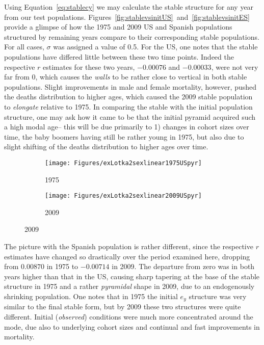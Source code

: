  \FloatBarrier
\label{sec:ex2sexdomweightsstabstruct}
Using Equation~\eqref{eq:stablecy} we may calculate the
stable structure for any year from our test populations.
Figures~\ref{fig:stablevsinitUS}~and~\ref{fig:stablevsinitES} provide a glimpse
of how the 1975 and 2009 US and Spanish populations structured by remaining
years compare to their corresponding stable populations. For all cases,
$\sigma$ was assigned a value of 0.5. For the US, one notes that the stable
populations have differed little between these two time points. Indeed the
respective $r$ estimates for these two years, $-0.00076$ and $-0.00033$, were 
not very far from 0, which causes the \textit{walls} to be rather close to vertical in both
stable populations. Slight improvements in male and female mortality, however,
pushed the deaths distribution to higher ages, which caused the 2009 stable
population to \textit{elongate} relative to 1975. In comparing the stable with the initial
population structure, one may ask how it came to be that the initial pyramid
acquired such a high modal age-- this will be due primarily to 1) changes in
cohort sizes over time, the baby boomers having still be rather young in 1975,
but also due to slight shifting of the deaths distribution to higher ages over
time.
 
\begin{figure}[!ht]
   \caption{US, stable ($\sigma = 0.05$) versus initial $e_y$-structures, 1975
   and 2009}
   \label{fig:stablevsinitUS}
        \centering
        \begin{subfigure}
                \centering
                \caption*{1975}
                \texttt{[image: Figures/exLotka2sexlinear1975USpyr]}
        \end{subfigure}
        \begin{subfigure}
                \centering
                \caption*{2009}
                \texttt{[image: Figures/exLotka2sexlinear2009USpyr]}
        \end{subfigure}
\end{figure}
 
The picture with the Spanish population is rather different, since the
respective $r$ estimates have changed so drastically over the period examined
here, dropping from $0.00870$ in 1975 to $-0.00714$ in 2009. The departure from
zero was in both years higher than that in the US, causing sharp tapering at the
base of the stable structure in 1975 and a rather \textit{pyramidal} shape in
2009, due to an endogenously shrinking population. One notes that in 1975 the
initial $e_y$ structure was very similar to the final stable form, but by 2009
these two structures were quite different. Initial (\textit{observed})
conditions were much more concentrated around the mode, due also to underlying
cohort sizes and continual and fast improvements in mortality.
 
